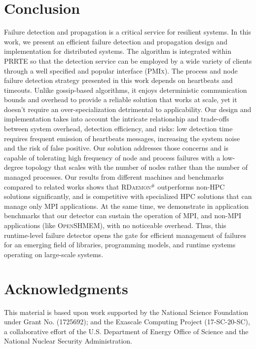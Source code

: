 \documentclass[5p,times,twocolumn]{elsarticle}
\newcommand{\prrte}[0]{\textsc{PRRTE}\xspace}
\newcommand{\pmix}[0]{\textsc{PMIx}\xspace}
\newcommand{\mpi}[0]{\textsc{MPI}\xspace}
\newcommand{\oshmem}[0]{\textsc{OpenSHMEM}\xspace}
\newcommand{\ourwork}[0]{\textsc{RDaemon}\ensuremath{^\#}\xspace}
\begin{document}
\section{Conclusion}\label{sec:conclusion}
Failure detection and propagation is a critical service for resilient systems. In this work, we present an efficient failure detection and propagation design and implementation for distributed systems.
The algorithm is integrated within \prrte so that the detection service
can be employed by a wide variety of clients through a well specified and
popular interface (\pmix). The process and node failure detection strategy presented in this work depends on heartbeats and timeouts. Unlike gossip-based algorithms,
it enjoys deterministic communication bounds and overhead to provide a reliable solution that works at scale,
yet it doesn't require an over-specialization detrimental to applicability.
Our design and implementation takes into account the intricate relationship and trade-offs between system overhead, detection efficiency, and risks: low detection time requires frequent emission of heartbeats messages, increasing the system noise and the risk of false positive. Our solution addresses those concerns and is capable of tolerating high frequency of node and process failures with a low-degree
topology that scales with the number of nodes rather than the number of
managed processes. Our results from different machines and benchmarks
compared to related works shows that \ourwork outperforms non-HPC solutions
significantly, and is competitive with specialized HPC solutions that can
manage only \mpi applications. At the same time, we demonstrate in application benchmarks that
our detector can sustain the operation of \mpi, and non-\mpi applications (like \oshmem), with no noticeable overhead. Thus, this runtime-level failure detector opens the gate for efficient management of failures for an emerging field
of libraries, programming models, and runtime systems operating on large-scale systems.

\section*{Acknowledgments}
%
This material is based upon work supported by the National Science Foundation under Grant No. (1725692); and the Exascale Computing Project (17-SC-20-SC), a collaborative effort of the
U.S. Department of Energy Office of Science and the National Nuclear Security Administration.

\balance

%
%

%

\end{document}
